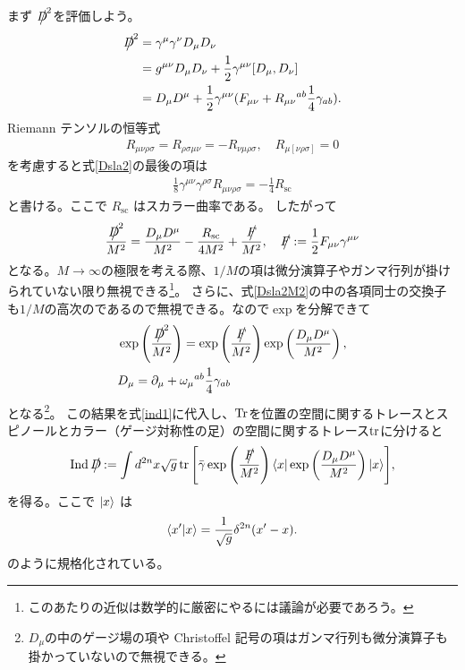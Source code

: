 \documentclass[12pt,a4paper]{jlreq}
\DeclareMathOperator*{\Ind}{\mathrm{Ind}}
\newcommand{\del}{\partial}
\newcommand{\gammab}{\bar{\gamma}}
\newcommand{\Dsla}{D\hspace{-0.65em}\big/}
\newcommand{\Fsla}{F\hspace{-0.6em}\big/}
\newcommand{\Rsc}{R_{\mathrm{sc}}}
\begin{document}
まず $\Dsla^2$を評価しよう。
\begin{align}
  \Dsla^2
   & =\gamma^{\mu}\gamma^{\nu}D_{\mu}D_{\nu}                                                  \nonumber\\
   & =g^{\mu\nu}D_{\mu}D_{\nu}+\frac12 \gamma^{\mu\nu}[D_{\mu},D_{\nu}]                       \nonumber\\
   & =D_{\mu}D^{\mu}+\frac12 \gamma^{\mu\nu}(F_{\mu\nu}+R_{\mu\nu}{}^{ab}\frac14\gamma_{ab}).
  \label{Dsla2}
\end{align}
Riemann テンソルの恒等式
\begin{align*}
  R_{\mu\nu\rho\sigma}=R_{\rho\sigma\mu\nu}=-R_{\nu\mu\rho\sigma}, \quad R_{\mu[\nu\rho\sigma]}=0
\end{align*}
を考慮すると式\eqref{Dsla2}の最後の項は
\begin{align*}
  \frac18\gamma^{\mu\nu}\gamma^{\rho\sigma}R_{\mu\nu\rho\sigma}
  =-\frac14 \Rsc
\end{align*}
と書ける。ここで $\Rsc$ はスカラー曲率である。
したがって
\begin{align}
  \frac{\Dsla^2}{M^2}=\frac{D_{\mu}D^{\mu}}{M^2}-\frac{\Rsc}{4M^2}+\frac{\Fsla}{M^2},\quad
  \Fsla:=\frac12 F_{\mu\nu}\gamma^{\mu\nu}
  \label{Dsla2M2}
\end{align}
となる。$M\to\infty$の極限を考える際、$1/M$の項は微分演算子やガンマ行列が掛けられていない限り無視できる\footnote{このあたりの近似は数学的に厳密にやるには議論が必要であろう。}。
さらに、式\eqref{Dsla2M2}の中の各項同士の交換子も$1/M$の高次のであるので無視できる。なので$\exp$を分解できて
\begin{align*}
   & \exp\left(\frac{\Dsla^2}{M^2}\right)=
  \exp\left(\frac{\Fsla}{M^2}\right)
  \exp\left(\frac{D_{\mu}D^{\mu}}{M^2}\right),                  \\
   & D_{\mu}=\del_{\mu}+\omega_{\mu}{}^{ab}\frac14 \gamma_{ab}
\end{align*}
となる\footnote{$D_{\mu}$の中のゲージ場の項や Christoffel 記号の項はガンマ行列も微分演算子も掛かっていないので無視できる。}。
この結果を式\eqref{ind1}に代入し、$\Tr$を位置の空間に関するトレースとスピノールとカラー（ゲージ対称性の足）の空間に関するトレース$\tr$に分けると
\begin{align}
  \Ind{\Dsla}:=\int d^{2n}x \sqrt{g}\tr\qty[\gammab
    \exp\left(\frac{\Fsla}{M^2}\right)
    \bra{x}\exp\left(\frac{D_{\mu}D^{\mu}}{M^2}\right)\ket{x}],
  \label{ind2}
\end{align}
を得る。ここで $\ket{x}$ は
\begin{align}
  \ip{x'}{x}=\frac{1}{\sqrt{g}}\delta^{2n}(x'-x).
\end{align}
のように規格化されている。
\end{document}
